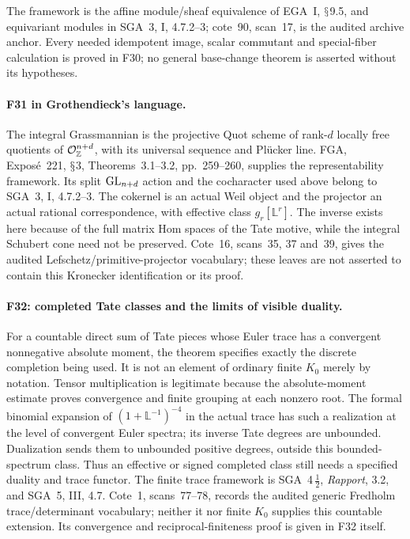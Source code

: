 \documentclass[11pt,a4paper]{article}
\renewcommand{\S}{\ensuremath{\mathsection}}
\newcommand{\fid}[1]{\textsf{#1}}\newcommand{\gate}[1]{\textsf{#1}}
\theoremstyle{named}\newtheorem{finding}{Finding}[section]
\theoremstyle{definition}\newtheorem{definition}[finding]{Definition}
\theoremstyle{remark}\newtheorem{remark}[finding]{Remark}
\begin{document}
The framework is the affine module/sheaf equivalence of EGA~I,
\S9.5, and equivariant modules in SGA~3, I, 4.7.2--3; cote~90,
scan~17, is the audited archive anchor. Every needed idempotent
image, scalar commutant and special-fiber calculation is proved
in \fid{F30}; no general base-change theorem is asserted without
its hypotheses.

\paragraph{\fid{F31} in Grothendieck's language.}
The integral Grassmannian is the projective Quot scheme of
rank-$d$ locally free quotients of $\mathcal O_{\mathbb Z}^{n+d}$,
with its universal sequence and Pl\"ucker line. FGA, Expos\'e~221,
\S3, Theorems~3.1--3.2, pp.~259--260, supplies the representability
framework. Its split $\mathrm{GL}_{n+d}$ action and the cocharacter used
above belong to SGA~3, I, 4.7.2--3. The cokernel is an actual
Weil object and the projector an actual rational correspondence,
with effective class $g_r[\mathbb L^r]$. The inverse exists here
because of the full matrix Hom spaces of the Tate motive, while
the integral Schubert cone need not be preserved. Cote~16,
scans~35, 37 and~39, gives the audited Lefschetz/primitive-projector
vocabulary; these leaves are not asserted to contain this
Kronecker identification or its proof.


\paragraph{\fid{F32}: completed Tate classes and the limits of visible duality.}
For a countable direct sum of Tate pieces whose Euler trace has a
convergent nonnegative absolute moment, the theorem specifies exactly
the discrete completion being used. It is not an element of ordinary
finite $K_0$ merely by notation. Tensor multiplication is legitimate
because the absolute-moment estimate proves convergence and finite
grouping at each nonzero root. The formal binomial expansion of
$(1+\mathbb L^{-1})^{-4}$ in the actual trace has such a realization
at the level of convergent Euler spectra; its inverse Tate degrees
are unbounded. Dualization sends them to unbounded positive degrees,
outside this bounded-spectrum class. Thus an effective or signed
completed class still needs a specified duality and trace functor.
The finite trace framework is SGA~4\,$\frac12$, \emph{Rapport},
3.2, and SGA~5, III, 4.7. Cote~1, scans~77--78, records the
audited generic Fredholm trace/determinant vocabulary; neither it
nor finite $K_0$ supplies this countable extension. Its convergence
and reciprocal-finiteness proof is given in \fid{F32} itself.
\end{document}
